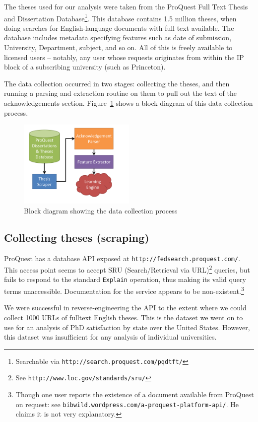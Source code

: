 The theses used for our analysis were taken from the ProQuest Full Text Thesis and Dissertation Database\footnote{Searchable via \texttt{http://search.proquest.com/pqdtft/}}. This database contains 1.5 million theses, when doing searches for English-language documents with full text available. The database includes metadata specifying features such as date of submission, University, Department, subject, and so on. All of this is freely available to licensed users -- notably, any user whose requests originates from within the IP block of a subscribing university (such as Princeton).

The data collection occurred in two stages: collecting the theses, and then running a parsing and extraction routine on them to pull out the text of the acknowledgements section.  Figure~\ref{fig:data_collect_block_diagram} shows a block diagram of this data collection process.

\begin{figure}
	\centering
	\includegraphics[width=0.5\textwidth]{block_diagram}
	\caption{Block diagram showing the data collection process}
	\label{fig:data_collect_block_diagram}
\end{figure}

\subsection*{Collecting theses (scraping)}
ProQuest has a database API exposed at \texttt{http://fedsearch.proquest.com/}. This access point seems to accept SRU (Search/Retrieval via URL)\footnote{See \texttt{http://www.loc.gov/standards/sru/}} queries, but fails to respond to the standard \texttt{Explain} operation, thus making its valid query terms unaccessible. Documentation for the service appears to be non-existent.\footnote{Though one user reports the existence of a document available from ProQuest on request: see \texttt{bibwild.wordpress.com/a-proquest-platform-api/}. He claims it is not very explanatory.}

We were successful in reverse-engineering the API to the extent where we could collect 1000 URLs of fulltext English theses. This is the dataset we went on to use for an analysis of PhD satisfaction by state over the United States. However, this dataset was insufficient for any analysis of individual universities.

